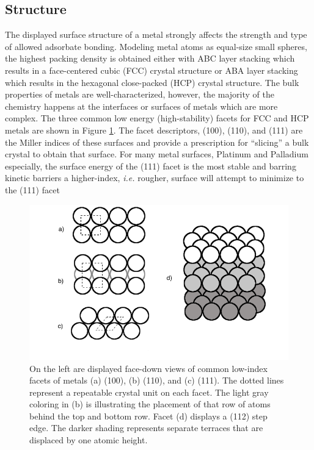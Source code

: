 \subsection{Structure}
The displayed surface structure of a metal strongly affects the strength and
type of allowed adsorbate bonding.  Modeling metal atoms as equal-size small
spheres, the highest packing density is obtained either with ABC layer stacking
which results in a face-centered cubic (FCC) crystal structure or ABA layer
stacking which results in the hexagonal close-packed (HCP) crystal structure.
The bulk properties of metals are well-characterized, however, the majority of
the chemistry happens at the interfaces or surfaces of metals which are more
complex. The three common low energy (high-stability) facets for FCC and HCP
metals are shown in Figure \ref{fig:facets}. The facet descriptors, (100),
(110), and (111) are the Miller indices of these surfaces and provide a
prescription for ``slicing'' a bulk crystal to obtain that surface. For many
metal surfaces, Platinum and Palladium especially, the surface energy of the
(111) facet is the most stable and barring kinetic barriers a higher-index,
{\em i.e.} rougher, surface will attempt to minimize to the (111) facet

\begin{figure}[p!]
  \includegraphics[width=\linewidth]{../figures/chap1/facets.pdf}
  \caption{On the left are displayed face-down views of common low-index facets
of metals (a) (100), (b) (110), and (c) (111). The dotted lines represent a
repeatable crystal unit on each facet. The light gray coloring in (b) is
illustrating the placement of that row of atoms behind the top and bottom row.
Facet (d) displays a (112) step edge. The darker shading represents separate
terraces that are displaced by one atomic height.}
\label{fig:facets}
\end{figure}

